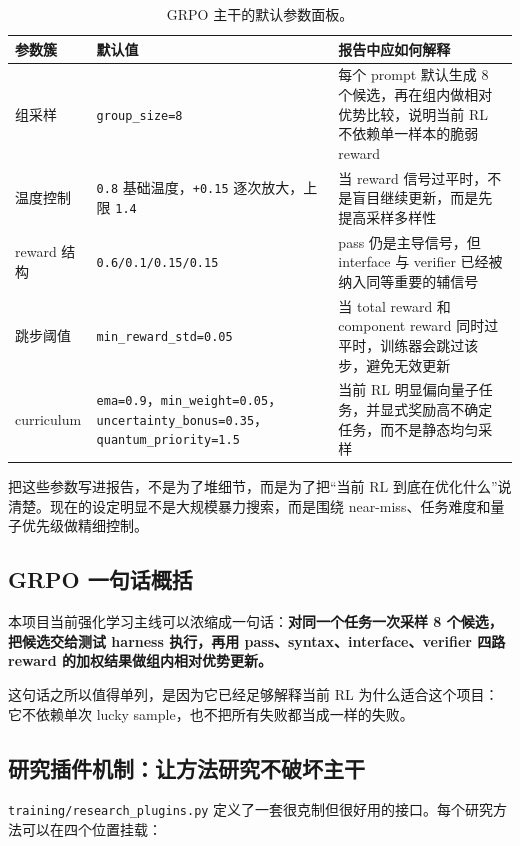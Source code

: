 \documentclass[11pt,a4paper]{article}
\newcommand{\code}[1]{\begingroup\ttfamily\footnotesize\nolinkurl{#1}\endgroup}
\begin{document}
\begin{table}[htbp]
\centering
\small
\begin{tabularx}{\textwidth}{p{3.1cm} p{2.0cm} Y}
\toprule
参数簇 & 默认值 & 报告中应如何解释 \\
\midrule
组采样 & \code{group\_size=8} & 每个 prompt 默认生成 8 个候选，再在组内做相对优势比较，说明当前 RL 不依赖单一样本的脆弱 reward \\
温度控制 & \code{0.8} 基础温度，\code{+0.15} 逐次放大，上限 \code{1.4} & 当 reward 信号过平时，不是盲目继续更新，而是先提高采样多样性 \\
reward 结构 & \code{0.6/0.1/0.15/0.15} & pass 仍是主导信号，但 interface 与 verifier 已经被纳入同等重要的辅信号 \\
跳步阈值 & \code{min\_reward\_std=0.05} & 当 total reward 和 component reward 同时过平时，训练器会跳过该步，避免无效更新 \\
curriculum & \code{ema=0.9}，\code{min\_weight=0.05}，\newline \code{uncertainty\_bonus=0.35}，\code{quantum\_priority=1.5} & 当前 RL 明显偏向量子任务，并显式奖励高不确定任务，而不是静态均匀采样 \\
\bottomrule
\end{tabularx}
\caption{GRPO 主干的默认参数面板。}
\label{tab:grpo-defaults}
\end{table}

把这些参数写进报告，不是为了堆细节，而是为了把“当前 RL 到底在优化什么”说清楚。现在的设定明显不是大规模暴力搜索，而是围绕 near-miss、任务难度和量子优先级做精细控制。

\subsection{GRPO 一句话概括}

本项目当前强化学习主线可以浓缩成一句话：\textbf{对同一个任务一次采样 8 个候选，把候选交给测试 harness 执行，再用 pass、syntax、interface、verifier 四路 reward 的加权结果做组内相对优势更新。}

这句话之所以值得单列，是因为它已经足够解释当前 RL 为什么适合这个项目：它不依赖单次 lucky sample，也不把所有失败都当成一样的失败。

\subsection{研究插件机制：让方法研究不破坏主干}

\code{training/research_plugins.py} 定义了一套很克制但很好用的接口。每个研究方法可以在四个位置挂载：
\end{document}
